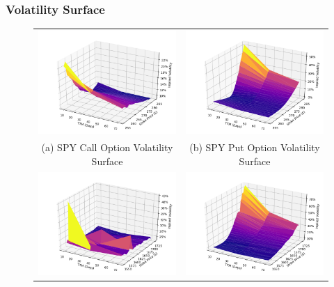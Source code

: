 \documentclass[10pt]{article}
\begin{document}
        \subsubsection{Volatility Surface}

        \begin{figure}
            \begin{tabular}{cc}
                \includegraphics[width=.475\textwidth]{bin/vol_surface/SPY_Call_3DVolSurface.png} &
                \includegraphics[width=.475\textwidth]{bin/vol_surface/SPY_Put_3DVolSurface.png} \\
                (a) SPY Call Option Volatility Surface &
                (b) SPY Put Option Volatility Surface \\
                \includegraphics[width=.475\textwidth]{bin/vol_surface/AMZN_Call_3DVolSurface.png} &
                \includegraphics[width=.475\textwidth]{bin/vol_surface/AMZN_Put_3DVolSurface.png} \\

\end{tabular}
\end{figure}
\end{document}
